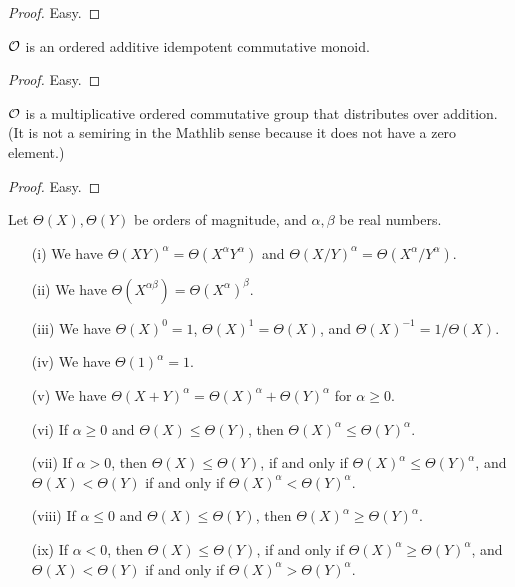 \begin{proof} Easy.
\end{proof}

\begin{corollary}\label{add-comm-mon} ${\mathcal O}$ is an ordered additive idempotent commutative monoid.
\end{corollary}

\begin{proof} Easy.
\end{proof}

\begin{lemma}\label{comm-semiring} ${\mathcal O}$ is a multiplicative ordered commutative group that distributes over addition.  (It is not a semiring in the Mathlib sense because it does not have a zero element.)
\end{lemma}

\begin{proof} Easy.
\end{proof}

\begin{lemma}\label{power-law}  Let $\Theta(X), \Theta(Y)$ be orders of magnitude, and $\alpha,\beta$ be real numbers.
    \begin{itemize}
    \item[(i)] We have $\Theta(XY)^\alpha = \Theta(X^\alpha Y^\alpha)$ and $\Theta(X/Y)^\alpha = \Theta(X^\alpha / Y^\alpha)$.
    \item[(ii)] We have $\Theta(X^{\alpha \beta}) = \Theta(X^\alpha)^\beta$.  
    \item[(iii)] We have $\Theta(X)^0 = 1$, $\Theta(X)^1 = \Theta(X)$, and $\Theta(X)^{-1} = 1 / \Theta(X)$.
    \item[(iv)] We have $\Theta(1)^\alpha = 1$.
    \item[(v)] We have $\Theta(X+Y)^\alpha = \Theta(X)^\alpha + \Theta(Y)^\alpha$ for $\alpha \geq 0$.
    \item[(vi)]  If $\alpha \geq 0$ and $\Theta(X) \leq \Theta(Y)$, then $\Theta(X)^\alpha \leq \Theta(Y)^\alpha$.
    \item[(vii)] If $\alpha > 0$, then $\Theta(X) \leq \Theta(Y)$, if and only if $\Theta(X)^\alpha \leq \Theta(Y)^\alpha$, and $\Theta(X) < \Theta(Y)$ if and only if $\Theta(X)^\alpha < \Theta(Y)^\alpha$.
    \item[(viii)] If $\alpha \leq 0$ and $\Theta(X) \leq \Theta(Y)$, then $\Theta(X)^\alpha \geq \Theta(Y)^\alpha$.
    \item[(ix)] If $\alpha < 0$, then $\Theta(X) \leq \Theta(Y)$, if and only if $\Theta(X)^\alpha \geq \Theta(Y)^\alpha$, and $\Theta(X) < \Theta(Y)$ if and only if $\Theta(X)^\alpha > \Theta(Y)^\alpha$.   
    \end{itemize}
\end{lemma}

